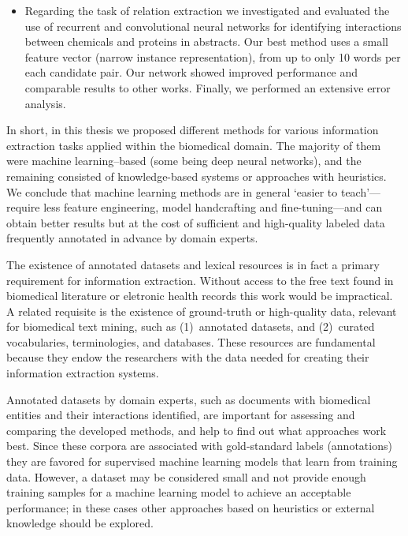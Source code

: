 \begin{itemize}
\item
Regarding the task of relation extraction we investigated and evaluated the use of recurrent and convolutional neural networks for identifying interactions between chemicals and proteins in  abstracts.
Our best method uses a small feature vector (narrow instance representation), from up to only 10 words per each candidate pair.
Our  network showed improved performance and comparable results to other works.
Finally, we performed an extensive error analysis.

\end{itemize}

In short, in this thesis we proposed different methods for various information extraction tasks applied within the biomedical domain.
The majority of them were machine learning--based (some being deep neural networks), and the remaining consisted of knowledge-based systems or approaches with heuristics.
We conclude that machine learning methods are in general `easier to teach'---require less feature engineering, model handcrafting and fine-tuning---and can obtain better results but at the cost of sufficient and high-quality labeled data frequently annotated in advance by domain experts.

The existence of annotated datasets and lexical resources is in fact a primary requirement for information extraction.
Without access to the free text found in biomedical literature or eletronic health records this work would be impractical.
A related requisite is the existence of ground-truth or high-quality data, relevant for biomedical text mining, such as (1)~annotated datasets, and (2)~curated vocabularies, terminologies, and databases.
These resources are fundamental because they endow the researchers with the data needed for creating their information extraction systems.

Annotated datasets by domain experts, such as documents with biomedical entities and their interactions identified, are important for assessing and comparing the developed methods, and help to find out what approaches work best.
Since these corpora are associated with gold-standard labels (annotations) they are favored for supervised machine learning models that learn from training data.
However, a dataset may be considered small and not provide enough training samples for a machine learning model to achieve an acceptable performance; in these cases other approaches based on heuristics or external knowledge should be explored.

